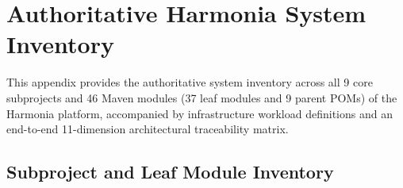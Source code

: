 
\chapter{Authoritative Harmonia System Inventory}
\label{app:system_inventory}

This appendix provides the authoritative system inventory across all 9 core subprojects and 46 Maven modules (37 leaf modules and 9 parent POMs) of the Harmonia platform, accompanied by infrastructure workload definitions and an end-to-end 11-dimension architectural traceability matrix.

\section{Subproject and Leaf Module Inventory}

